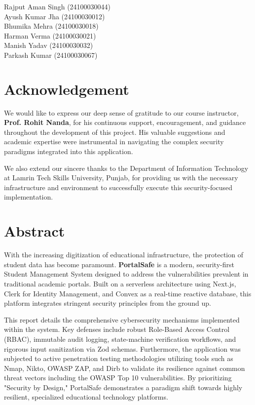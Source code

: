 \documentclass[12pt,a4paper]{report}
\begin{document}
\vspace{2cm}
\begin{flushright}
Rajput Aman Singh (24100030044)\\
Ayush Kumar Jha (24100030012)\\
Bhumika Mehra (24100030018)\\
Harman Verma (24100030021)\\
Manish Yadav (24100030032)\\
Parkash Kumar (24100030067)\\
\end{flushright}

\chapter*{Acknowledgement}
We would like to express our deep sense of gratitude to our course instructor, \textbf{Prof. Rohit Nanda}, for his continuous support, encouragement, and guidance throughout the development of this project. His valuable suggestions and academic expertise were instrumental in navigating the complex security paradigms integrated into this application. 

We also extend our sincere thanks to the Department of Information Technology at Lamrin Tech Skills University, Punjab, for providing us with the necessary infrastructure and environment to successfully execute this security-focused implementation.

\chapter*{Abstract}
With the increasing digitization of educational infrastructure, the protection of student data has become paramount. \textbf{PortalSafe} is a modern, security-first Student Management System designed to address the vulnerabilities prevalent in traditional academic portals. Built on a serverless architecture using Next.js, Clerk for Identity Management, and Convex as a real-time reactive database, this platform integrates stringent security principles from the ground up.

This report details the comprehensive cybersecurity mechanisms implemented within the system. Key defenses include robust Role-Based Access Control (RBAC), immutable audit logging, state-machine verification workflows, and rigorous input sanitization via Zod schemas. Furthermore, the application was subjected to active penetration testing methodologies utilizing tools such as Nmap, Nikto, OWASP ZAP, and Dirb to validate its resilience against common threat vectors including the OWASP Top 10 vulnerabilities. By prioritizing "Security by Design," PortalSafe demonstrates a paradigm shift towards highly resilient, specialized educational technology platforms.
\end{document}
